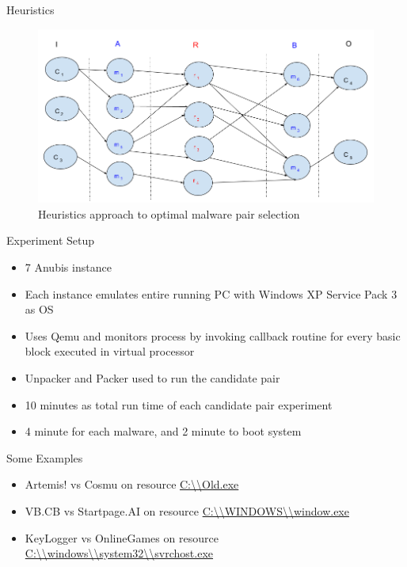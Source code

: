 \documentclass{beamer}
\begin{document}
\begin{frame}[plain]{Heuristics}
\begin{figure}[H]
  \centering
  \includegraphics[scale=0.3]{figures/dhkheuristics.png}
  \caption[]{Heuristics approach to optimal malware pair selection}\label{fig:dhkheuristics}
  \centering
\end{figure}
\end{frame}
\begin{frame}[h]{Experiment Setup}
  \begin{itemize}
    \item 7 Anubis instance
    \item Each instance emulates entire running PC with Windows XP Service Pack 3 as OS
    \item Uses Qemu and monitors process by invoking callback routine for every basic block executed in virtual processor
    \item Unpacker and Packer used to run the candidate pair
    \item 10 minutes as total run time of each candidate pair experiment
    \item 4 minute for each malware, and 2 minute to boot system
  \end{itemize}
\end{frame}
\begin{frame}{Some Examples}
  \begin{itemize}
    \item Artemis! vs Cosmu on resource \url{C:\\Old.exe}
    \item VB.CB vs Startpage.AI on resource \url{C:\\WINDOWS\\window.exe}
    \item KeyLogger vs OnlineGames on resource \url{C:\\windows\\system32\\svrchost.exe}
  \end{itemize}
\end{frame}
\end{document}
